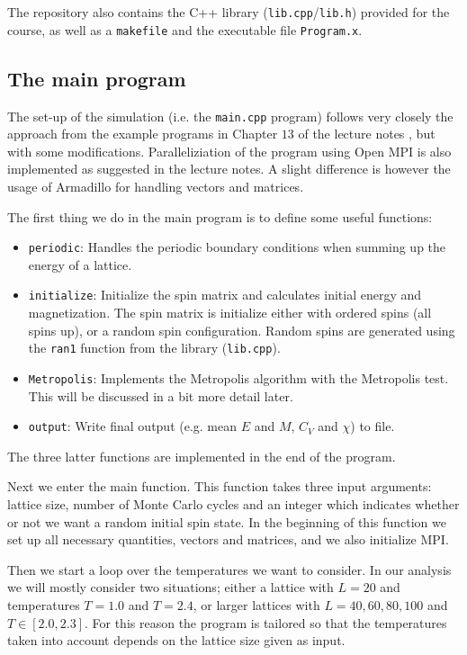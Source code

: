 \documentclass[12pt, a4paper]{article}
\begin{document}
The repository also contains the C++ library (\texttt{lib.cpp}/\texttt{lib.h}) provided for the course, 
as well as a \texttt{makefile} and the executable file \texttt{Program.x}. 

\subsection{The main program}

The set-up of the simulation (i.e. the \texttt{main.cpp} program) follows very closely the approach from 
the example programs in Chapter $13$ of the lecture notes \cite{Lecture Notes}, but with some 
modifications. Paralleliziation of the program using Open MPI is also implemented as suggested in 
the lecture notes. A slight difference is however the usage of Armadillo \cite{Armadillo} for handling 
vectors and matrices.   

The first thing we do in the main program is to define some useful functions:  
\begin{itemize}
\item \texttt{periodic}: Handles the periodic boundary conditions when summing up the energy of a lattice.
\item \texttt{initialize}: Initialize the spin matrix and calculates initial energy and magnetization. 
The spin matrix is initialize either with ordered spins (all spins up), or a random spin configuration. 
Random spins are generated using the \texttt{ran1} function from the library (\texttt{lib.cpp}).
\item \texttt{Metropolis}: Implements the Metropolis algorithm with the Metropolis test. This will be 
discussed in a bit more detail later. 
\item \texttt{output}: Write final output (e.g. mean $E$ and $M$, $C_V$ and $\chi$) to file. 
\end{itemize}
The three latter functions are implemented in the end of the program. 

Next we enter the main function. This function takes three input arguments: lattice size, number of 
Monte Carlo cycles and an integer which indicates whether or not we want a random initial spin state. 
In the beginning of this function we set up all necessary quantities, vectors and matrices, and we 
also initialize MPI. 

Then we start a loop over the temperatures we want to consider. In our analysis we will mostly 
consider two situations; either a lattice with $L=20$ and temperatures $T=1.0$ and $T=2.4$, or 
larger lattices with $L=40,60,80,100$ and $T \in \left[2.0,2.3\right]$. For this reason the program 
is tailored so that the temperatures taken into account depends on the lattice size given as input. 
\end{document}
